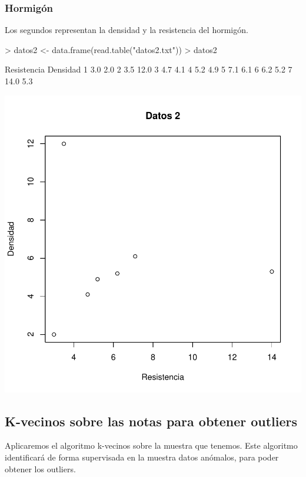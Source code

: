 \documentclass [a4paper] {article}
\begin{document}
\newpage
\subsubsection{Hormigón}
Los segundos representan la densidad y la resistencia del hormigón.
\begin{Schunk}
\begin{Sinput}
> datos2 <- data.frame(read.table("datos2.txt"))
> datos2
\end{Sinput}
\begin{Soutput}
  Resistencia Densidad
1         3.0      2.0
2         3.5     12.0
3         4.7      4.1
4         5.2      4.9
5         7.1      6.1
6         6.2      5.2
7        14.0      5.3
\end{Soutput}
\end{Schunk}
\begin{center}
\includegraphics{entrega-plot_datos2}
\end{center}

\newpage
\subsection{K-vecinos sobre las notas para obtener outliers}
Aplicaremos el algoritmo k-vecinos sobre la muestra que tenemos.
Este algoritmo identificará de forma supervisada en la muestra datos anómalos, para poder obtener los outliers.
\end{document}
